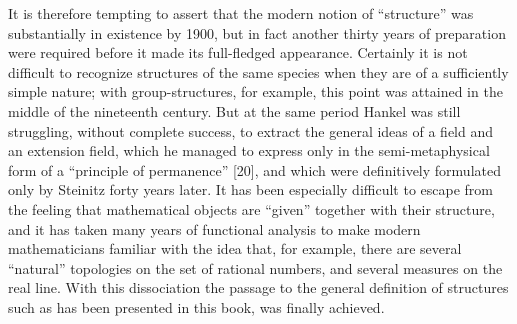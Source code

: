 It is therefore tempting to assert that the modern notion of ``structure'' was substantially in existence by 1900, but in fact another thirty years of preparation were required before it made its full-fledged appearance. Certainly it is not difficult to recognize structures of the same species when they are of a sufficiently simple nature; with group-structures, for example, this point was attained in the middle of the nineteenth century. But at the same period Hankel was still struggling, without complete success, to extract the general ideas of a field and an extension field, which he managed to express only in the semi-metaphysical form of a ``principle of permanence'' {[}20{]}, and which were definitively formulated only by Steinitz forty years later. It has been especially difficult to escape from the feeling that mathematical objects are ``given'' together with their structure, and it has taken many years of functional analysis to make modern mathematicians familiar with the idea that, for example, there are several ``natural'' topologies on the set of rational numbers, and several measures on the real line. With this dissociation the passage to the general definition of structures such as has been presented in this book, was finally achieved.

